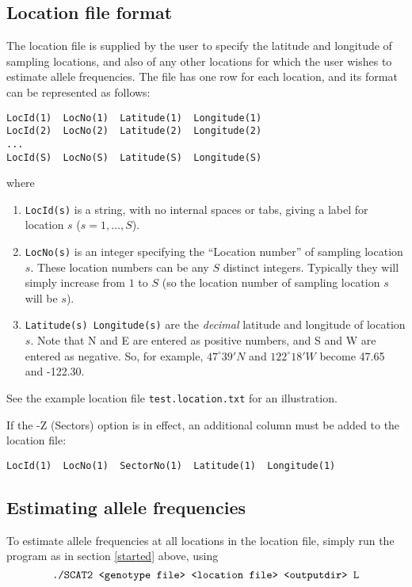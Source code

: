 \documentclass[10pt,titlepage,times,letterpaper]{article}
\begin{document}
\subsection{Location file format}

The location file is supplied by the user to specify the latitude and
longitude of sampling locations, and also of any other locations
for which the user wishes to estimate allele frequencies.
The file has one row for each location, and its format 
can be represented as follows:
\begin{verbatim}
LocId(1)  LocNo(1)  Latitude(1)  Longitude(1)
LocId(2)  LocNo(2)  Latitude(2)  Longitude(2)
...
LocId(S)  LocNo(S)  Latitude(S)  Longitude(S)
\end{verbatim}
where
\begin{enumerate}
\item{\tt LocId(s)} is a string, with no internal spaces or tabs, giving a label for location $s$
($s = 1,\dots,S$).
\item{\tt LocNo(s)} is an integer specifying the ``Location
number'' of sampling location $s$. These location numbers can be
any $S$ distinct integers. Typically they will simply increase from $1$ to $S$
(so the location number of sampling location $s$ will be $s$). 
\item{{\tt Latitude(s) Longitude(s)}} are the {\it decimal} latitude
and longitude of location $s$. Note that N and E are entered as
positive numbers, and S and W are entered as negative. So, for
example, $47^\circ 39' N$ and $122^\circ 18' W$ become 47.65 and -122.30.
\end{enumerate}
See the example location file {\tt test.location.txt} for an illustration.

If the -Z (Sectors) option is in effect, an additional column must be added to
the location file:

\begin{small}
\begin{verbatim}
LocId(1)  LocNo(1)  SectorNo(1)  Latitude(1)  Longitude(1)
\end{verbatim}
\end{small}


\subsection{Estimating allele frequencies}

To estimate allele frequencies at all locations in the location
file, simply run the program as in section \ref{started} above,
using
$$\text{{\tt ./SCAT2 <genotype file> <location file> <outputdir> L}}$$
\end{document}
